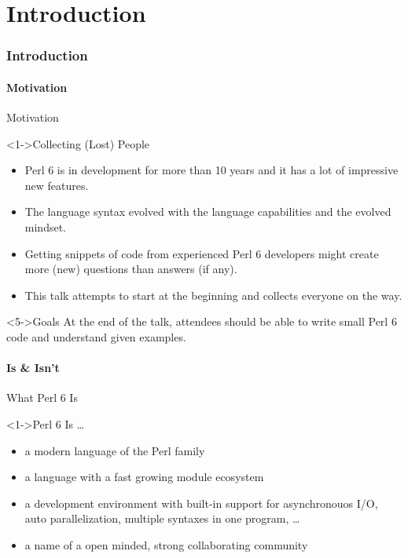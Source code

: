 \documentclass[ngerman,xcolor={table,dvipsnames},smaller,compress,hyperref={bookmarks,colorlinks}]{beamer}%
\begin{document}
\part{Introduction}

\section{Introduction}

\subsection{Motivation}

\begin{frame}[fragile]{Motivation}
\begin{block}<1->{Collecting (Lost) People}
\begin{itemize}
\item<1-> Perl 6 is in development for more than 10 years and it has a lot of
          impressive new features.
\item<2-> The language syntax evolved with the language capabilities and the
          evolved mindset.
\item<3-> Getting snippets of code from experienced Perl 6 developers might create
          more (new) questions than answers (if any).
\item<4-> This talk attempts to start at the beginning and collects everyone
          on the way.
\end{itemize}
\end{block}

\begin{block}<5->{Goals}
At the end of the talk, attendees should be able to write small Perl 6 code
and understand given examples.
\end{block}
\end{frame}

\subsection{Is \& Isn't}

\begin{frame}[fragile]{What Perl 6 Is}
\begin{block}<1->{Perl 6 Is \ldots}
\begin{itemize}
\item<1-> a modern language of the Perl family
\item<2-> a language with a fast growing module ecosystem
\item<3-> a development environment with built-in support for asynchronouos I/O,
          auto parallelization, multiple syntaxes in one program, \ldots
\item<4-> a name of a open minded, strong collaborating community
\end{itemize}
\end{block}
\end{frame}
\end{document}
